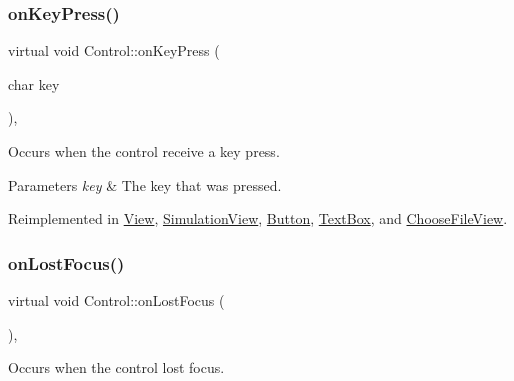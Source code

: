 \mbox{\label{class_control_a4731a62a9ea0510d51924509ae74c93e}} 
\subsubsection{\texorpdfstring{onKeyPress()}{onKeyPress()}}
{\footnotesize\ttfamily virtual void Control\+::on\+Key\+Press (\begin{DoxyParamCaption}\item[{char}]{key }\end{DoxyParamCaption})\hspace{0.3cm}{\ttfamily [inline]}, {\ttfamily [virtual]}}



Occurs when the control receive a key press. 


\begin{DoxyParams}{Parameters}
{\em key} & The key that was pressed.\\
\hline
\end{DoxyParams}


Reimplemented in \mbox{\hyperlink{class_view_ab391ca9800c413c543be7f2f6b9716d2}{View}}, \mbox{\hyperlink{class_simulation_view_a3663c5246a999ab4f2ffd503c0e3d274}{Simulation\+View}}, \mbox{\hyperlink{class_button_ac697a388171f59e9953eb6ae1dcf37a1}{Button}}, \mbox{\hyperlink{class_text_box_ae879afb224d1ad754996d2386743c2da}{Text\+Box}}, and \mbox{\hyperlink{class_choose_file_view_a011a3bf65dfc4b5e02327760ab8370ea}{Choose\+File\+View}}.

\mbox{\label{class_control_abbc8ce4460f790b4a5cf3dcb102b3f46}} 
\subsubsection{\texorpdfstring{onLostFocus()}{onLostFocus()}}
{\footnotesize\ttfamily virtual void Control\+::on\+Lost\+Focus (\begin{DoxyParamCaption}{ }\end{DoxyParamCaption})\hspace{0.3cm}{\ttfamily [inline]}, {\ttfamily [virtual]}}



Occurs when the control lost focus. 



